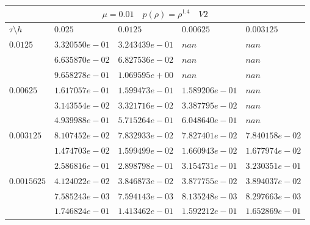 \documentclass[a4paper,12pt]{extarticle}
\begin{document}
\begin{tabular}{|l|l|l|l|l|}
	\hline
	\multicolumn{5}{|c|}{$\mu =0.01 \quad  p(\rho) = \rho^{1.4} \quad V2$}\\
	\hline
	$\tau\setminus h$ & $0.025$ & $0.0125$ & $0.00625$ & $0.003125$\\
	\hline
	$0.0125$  & $3.320550e-01$ & $3.243439e-01$ & $nan$ & $nan$\\
	& $6.635870e-02$ & $6.827536e-02$ & $nan$ & $nan$\\
	& $9.658278e-01$ & $1.069595e+00$ & $nan$ & $nan$\\
	\hline
	$0.00625$  & $1.617057e-01$ & $1.599473e-01$ & $1.589206e-01$ & $nan$\\
	& $3.143554e-02$ & $3.321716e-02$ & $3.387795e-02$ & $nan$\\
	& $4.939988e-01$ & $5.715264e-01$ & $6.048640e-01$ & $nan$\\
	\hline
	$0.003125$  & $8.107452e-02$ & $7.832933e-02$ & $7.827401e-02$ & $7.840158e-02$\\
	& $1.474703e-02$ & $1.599499e-02$ & $1.660943e-02$ & $1.677974e-02$\\
	& $2.586816e-01$ & $2.898798e-01$ & $3.154731e-01$ & $3.230351e-01$\\
	\hline
	$0.0015625$  & $4.124022e-02$ & $3.846873e-02$ & $3.877755e-02$ & $3.894037e-02$\\
	& $7.585243e-03$ & $7.594143e-03$ & $8.135248e-03$ & $8.297663e-03$\\
	& $1.746824e-01$ & $1.413462e-01$ & $1.592212e-01$ & $1.652869e-01$\\
	\hline
\end{tabular}
\end{document}
